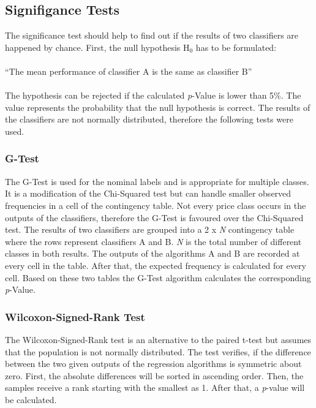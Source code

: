 \subsection{Signifigance Tests}
The significance test should help to find out if the results of two classifiers are happened by chance. First, the null hypothesis H$_{0}$ has to be formulated:\\\\
``The mean performance of classifier A is the same as classifier B''\\\\
The hypothesis can be rejected if the calculated \textit{p}-Value is lower than 5\%. The value represents the probability that the null hypothesis is correct. The results of the classifiers are not normally distributed, therefore the following tests were used. 
\subsubsection{G-Test}
The G-Test\cite{gtest} is used for the nominal labels and is appropriate for multiple classes. It is a modification of the Chi-Squared test but can handle smaller observed frequencies in a cell of the contingency table. Not every price class occurs in the outputs of the classifiers, therefore the G-Test is favoured over the Chi-Squared test. The results of two classifiers are grouped into a 2 x \textit{N} contingency table where the rows represent classifiers A and B. \textit{N} is the total number of different classes in both results. The outputs of the algorithms A and B are recorded at every cell in the table. After that, the expected frequency is calculated for every cell. Based on these two tables the G-Test algorithm calculates the corresponding \textit{p}-Value. 
\subsubsection{Wilcoxon-Signed-Rank Test}
The Wilcoxon-Signed-Rank test\cite{wilcoxon} is an alternative to the paired t-test but assumes that the population is not normally distributed. The test verifies, if the difference between the two given outputs of the regression algorithms is symmetric about zero. First, the absolute differences will be sorted in ascending order. Then, the samples receive a rank starting with the smallest as 1. After that, a \textit{p}-value will be calculated.
